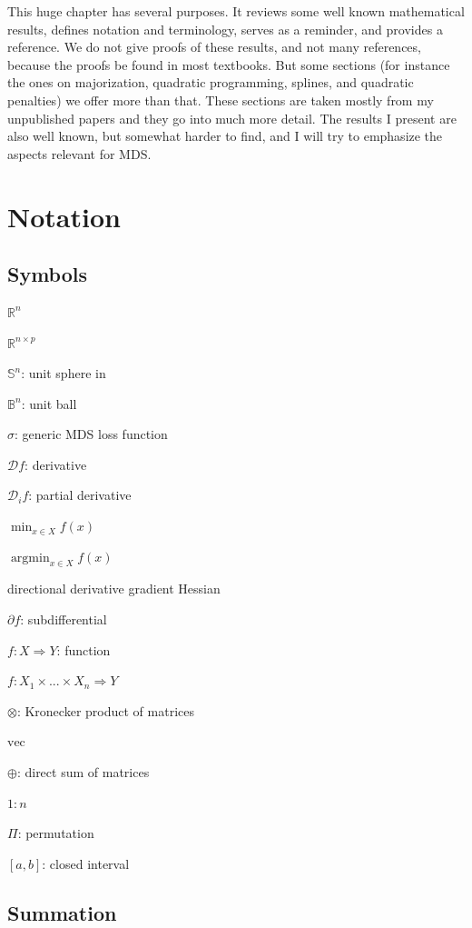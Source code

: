 \documentclass[
  12pt,
]{book}
\theoremstyle{definition}
\theoremstyle{definition}
\theoremstyle{definition}
\theoremstyle{definition}
\theoremstyle{remark}
\begin{document}
This huge chapter has several purposes. It reviews some well known mathematical
results, defines notation and terminology, serves as a reminder, and provides a reference. We do not give proofs of these results, and not many references, because the proofs be found in most textbooks. But some sections (for instance the ones on
majorization, quadratic programming, splines, and quadratic penalties) we offer more than that. These sections are taken mostly from my unpublished papers and they go into much more detail. The results I present are also well known, but somewhat harder to find, and I will try to emphasize the aspects relevant for MDS.

\hypertarget{apnotation}{%
\section{Notation}\label{apnotation}}

\hypertarget{symbols}{%
\subsection{Symbols}\label{symbols}}

\(\mathbb{R}^n\)

\(\mathbb{R}^{n\times p}\)

\(\mathbb{S}^{n}\): unit sphere in

\(\mathbb{B}^{n}\): unit ball

\(\sigma\): generic MDS loss function

\(\mathcal{D}f\): derivative

\(\mathcal{D}_if\): partial derivative

\(\min_{x\in X} f(x)\)

\(\mathop{\text{argmin}}_{x\in X} f(x)\)

directional derivative
gradient
Hessian

\(\partial f\): subdifferential

\(f:X\Rightarrow Y\): function

\(f:X_1\times...\times X_n\Rightarrow Y\)

\(\otimes\): Kronecker product of matrices

\(\text{vec}\)

\(\oplus\): direct sum of matrices

\(1:n\)

\(\Pi\): permutation

\([a,b]\): closed interval

\hypertarget{summation}{%
\subsection{Summation}\label{summation}}
\end{document}
